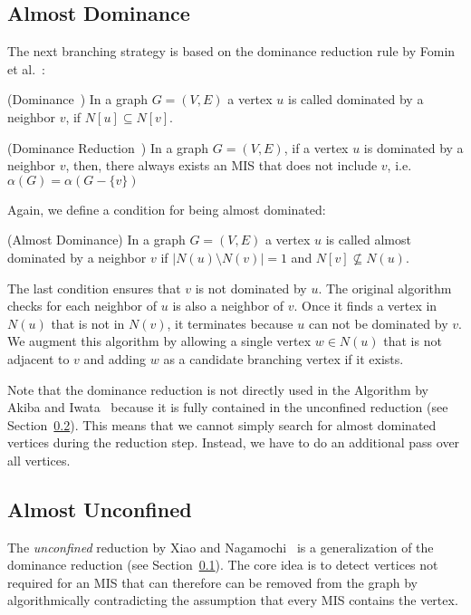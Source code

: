 \documentclass[a4paper,UKenglish,cleveref, autoref, thm-restate]{lipics-v2021}
\begin{document}
\subsection{Almost Dominance}
\label{sec:almost_dominance}

The next branching strategy is based on the dominance reduction rule by Fomin et al.~\cite{Fomin}:

\begin{definition} (Dominance~\cite{Fomin})
  In a graph $G=(V,E)$ a vertex $u$ is called dominated by a neighbor $v$, if $N[u]\subseteq N[v]$.
\end{definition}

\begin{theorem} (Dominance Reduction~\cite{Fomin}) In a graph $G=(V,E)$, if a
  vertex $u$ is dominated by a neighbor $v$, then, there always exists an MIS that does not include $v$, i.e.$\alpha(G)=\alpha(G-\{v\})$
\end{theorem}

Again, we define a condition for being almost dominated:

\begin{definition} (Almost Dominance)
  In a graph $G=(V,E)$ a vertex $u$ is called almost dominated by a neighbor $v$ if $|N(u)\setminus N(v)| = 1$ and $N[v]\not\subseteq N(u)$.
\end{definition}
 The last condition ensures that $v$ is not dominated by $u$. The original
 algorithm checks for each neighbor of $u$ is also a neighbor of $v$. Once it
 finds a vertex in $N(u)$ that is not in $N(v)$, it terminates because $u$ can not
 be dominated by $v$. We augment this algorithm by allowing a single vertex $w
 \in N(u)$ that is not adjacent to $v$ and adding $w$ as a candidate branching
 vertex if it exists.

 Note that the dominance reduction is not directly used in the Algorithm by
 Akiba and Iwata~\cite{AkibaIwata} because it is fully contained in the unconfined
 reduction (see Section~\ref{sec:almost_unconfined}). This means that we cannot
 simply search for almost dominated vertices during the reduction step. Instead,
 we have to do an additional pass over all vertices.
 
\subsection{Almost Unconfined}
\label{sec:almost_unconfined}

The \emph{unconfined} reduction by Xiao and Nagamochi~\cite{XiaoNagamochi} is a generalization of the dominance reduction
(see Section~\ref{sec:almost_dominance}).
The core idea is to detect vertices not required for an MIS
that can therefore can be removed from the graph by algorithmically contradicting the assumption that every MIS contains the vertex.
\end{document}
